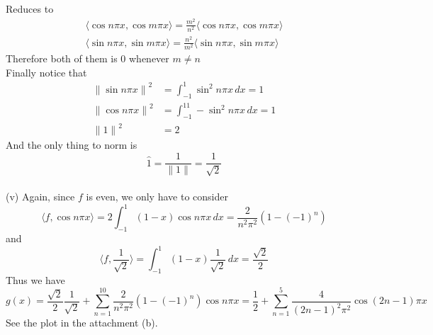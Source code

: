 \documentclass[12pt]{article}
\def\dotp#1#2{\langle#1,#2\rangle}
\begin{document}
Reduces to
\begin{align*}
\dotp{\cos{n\pi x}}{\cos{m\pi x}}=\frac{m^2}{n^2}\dotp{\cos{n\pi x}}{\cos{m\pi x}}\\
\dotp{\sin{n\pi x}}{\sin{m\pi x}}=\frac{n^2}{m^2}\dotp{\sin{n\pi x}}{\sin{m\pi x}}
\end{align*}
Therefore both of them is $0$ whenever $m\neq n$\\
Finally notice that 
\begin{align*}
{\|\sin{n\pi x}\|}^2&=\int_{-1}^1\sin^2{n\pi x}\,dx=1\\
{\|\cos{n\pi x}\|}^2&=\int_{-1}^11-\sin^2{n\pi x}\,dx=1\\
{\|1\|}^2&=2
\end{align*}
And the only thing to norm is 
\[
\hat{1}=\frac{1}{{\|1\|}}=\frac{1}{\sqrt2}
\]\\[0.5 em]
(v) Again, since $f$ is even, we only have to consider
\[
\dotp{f}{\cos n\pi x}=2\int_{-1}^1(1-x)\cos{n\pi x}\,dx=\frac{2}{n^2{\pi}^2}(1-{(-1)}^n)
\]
and
\[
\dotp{f}{\frac{1}{\sqrt2}}=\int_{-1}^1(1-x)\frac{1}{\sqrt2}\,dx=\frac{\sqrt2}{2}
\]
Thus we have
\[
g(x)=\frac{\sqrt2}{2}\frac{1}{\sqrt{2}}+\sum_{n=1}^{10}\frac{2}{n^2{\pi}^2}(1-{(-1)}^n)\cos {n\pi x}=\frac{1}{2}+\sum_{n=1}^{5}\frac{4}{{(2n-1)}^2{\pi}^2}\cos {(2n-1)\pi x}
\]
See the plot in the attachment (b).
\end{document}
